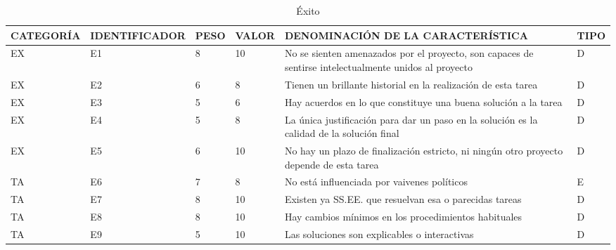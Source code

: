 \documentclass[a4paper,12pt]{article}
\begin{document}
\begin{table}[h]
	\centering
	\begin{tabular}{|l|l|l|l|p{4cm}|l|}
		\hline
		\scriptsize CATEGORÍA & \scriptsize IDENTIFICADOR & \scriptsize PESO & \scriptsize VALOR & \scriptsize DENOMINACIÓN DE LA CARACTERÍSTICA                                                                        & \scriptsize TIPO \\ \hline
		EX                    & E1                        & 8                & 10                & No se sienten amenazados por el proyecto, son capaces de sentirse intelectualmente unidos al proyecto                & D                \\ \hline
		EX                    & E2                        & 6                & 8                 & Tienen un brillante historial en la realización de esta tarea                                                        & D                \\ \hline
		EX                    & E3                        & 5                & 6                 & Hay acuerdos en lo que constituye una buena solución a la tarea                                                      & D                \\ \hline
		EX                    & E4                        & 5                & 8                 & La única justificación para dar un paso en la solución es la calidad de la solución final                            & D                \\ \hline
		EX                    & E5                        & 6                & 10                & No hay un plazo de finalización estricto, ni ningún otro proyecto depende de esta tarea                              & D                \\ \hline
		TA                    & E6                        & 7                & 8                 & No está influenciada por vaivenes políticos                                                                          & E                \\ \hline
		TA                    & E7                        & 8                & 10                & Existen ya SS.EE. que resuelvan esa o parecidas tareas                                                               & D                \\ \hline
		TA                    & E8                        & 8                & 10                & Hay cambios mínimos en los procedimientos habituales                                                                 & D                \\ \hline
		TA                    & E9                        & 5                & 10                & Las soluciones son explicables o interactivas                                                                        & D                \\ \hline
	\end{tabular}
	\caption{Éxito}
	\label{tab:exito1}
\end{table}
\end{document}
